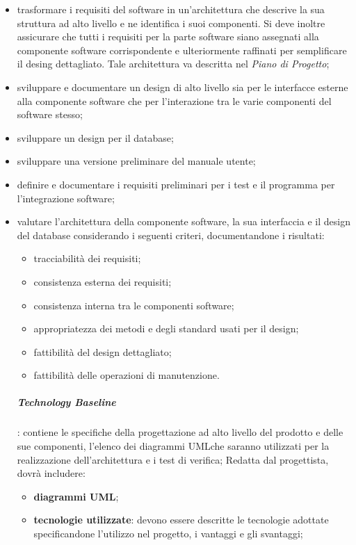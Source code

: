 			\begin{itemize}
			\item trasformare i requisiti del software in un'architettura che descrive la sua struttura ad alto livello e ne identifica i suoi componenti. Si deve inoltre assicurare che tutti i requisiti per la parte software siano assegnati alla componente software corrispondente e ulteriormente raffinati per semplificare il desing dettagliato. Tale architettura va descritta nel \textit{Piano di Progetto};
			\item sviluppare e documentare un design di alto livello sia per le interfacce esterne alla componente software che per l'interazione tra le varie componenti del software stesso;
			\item sviluppare un design per il database;
			\item sviluppare una versione preliminare del manuale utente;
			\item definire e documentare i requisiti preliminari per i test e il programma per l'integrazione software;
			\item valutare l'architettura della componente software, la sua interfaccia e il design del database considerando i seguenti criteri, documentandone i risultati:
			\begin{itemize}
			\item tracciabilità dei requisiti;
			\item consistenza esterna dei requisiti;
			\item consistenza interna tra le componenti software;
			\item appropriatezza dei metodi e degli standard usati per il design;
			\item fattibilità del design dettagliato;
			\item fattibilità delle operazioni di manutenzione.
			\end{itemize}
			\subparagraph{Technology Baseline}: contiene le specifiche della progettazione ad alto livello del prodotto e delle sue componenti, l'elenco dei diagrammi UML\glosp che saranno utilizzati per la realizzazione dell'architettura e i test di verifica;\newline \newline
			Redatta dal progettista, dovrà includere:
			\begin{itemize}
				\item \textbf{diagrammi UML\glo};
				\item \textbf{tecnologie utilizzate}: devono essere descritte le tecnologie adottate specificandone l'utilizzo nel progetto, i vantaggi e gli svantaggi;

\end{itemize}
\end{itemize}
